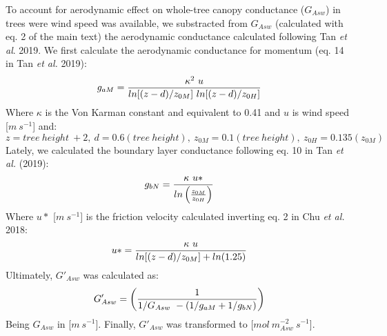 \documentclass[11pt,twoside]{reedthesis}
\begin{document}
To account for aerodynamic effect on whole-tree canopy conductance
(\(G_{Asw}\)) in trees were wind speed was available, we substracted
from \(G_{Asw}\) (calculated with eq. 2 of the main text) the
aerodynamic conductance calculated following Tan \emph{et al}. 2019. We
first calculate the aerodynamic conductance for momentum (eq. 14 in Tan
\emph{et al.} 2019):
\begin{equation}
g_{aM} = {{\kappa^{2}\ u} \over{ln[(z-d)/z_{0M}]\ ln[(z-d)/z_{0H}]}}
\end{equation}
Where \(\kappa\) is the Von Karman constant and equivalent to 0.41 and
\(u\) is wind speed {[}\(m\ s^{-1}\){]} and:
\begin{equation}
z = tree\ height\ + 2,\ d = 0.6(tree\ height),\ z_{0M}= 0.1(tree\ height),\ z_{0H}= 0.135(z_{0M})
\end{equation}
Lately, we calculated the boundary layer conductance following eq. 10 in
Tan \emph{et al.} (2019):
\begin{equation}
g_{bN} = {{\kappa\ u*} \over {ln\left({z_{0M}} \over {z_{0H}}\right)}}
\end{equation}
Where \(u*\) {[}\(m\ s^{-1}\){]} is the friction velocity calculated
inverting eq. 2 in Chu \emph{et al.} 2018:
\begin{equation}
u* = {\kappa \ u \over {ln[(z-d)/z_{0M}] + ln(1.25)}}
\end{equation}
Ultimately, \(G'_{Asw}\) was calculated as:
\begin{equation}
G'_{Asw}= \left({1 \over 1/G_{Asw} \ - (1/g_{aM} + 1/g_{bN})}\right)
\end{equation}
Being \(G_{Asw}\) in {[}\(m \ s^{-1}\){]}. Finally, \(G'_{Asw}\) was
transformed to {[}\(mol \ m^{-2}_{Asw} \ s^{-1}\){]}.

\newpage
\end{document}
